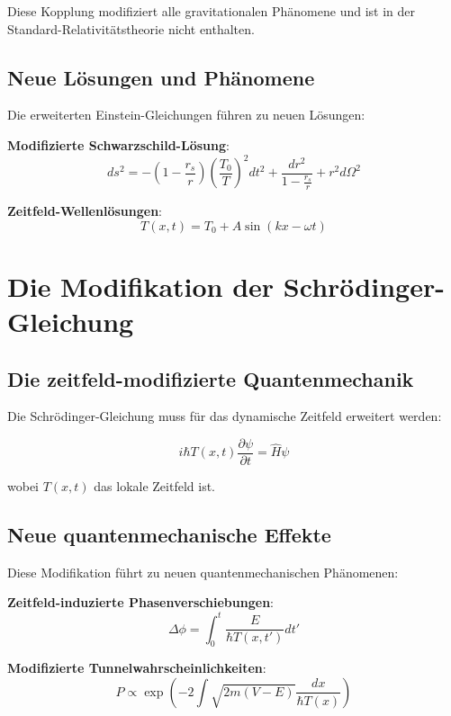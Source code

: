 \documentclass[12pt,a4paper]{report}
\begin{document}
Diese Kopplung modifiziert alle gravitationalen Phänomene und ist in der Standard-Relativitätstheorie nicht enthalten.

\subsection{Neue Lösungen und Phänomene}

Die erweiterten Einstein-Gleichungen führen zu neuen Lösungen:

\textbf{Modifizierte Schwarzschild-Lösung}:
\begin{equation}
	ds^2 = -\left(1-\frac{r_s}{r}\right)\left(\frac{T_0}{T}\right)^2 dt^2 + \frac{dr^2}{1-\frac{r_s}{r}} + r^2d\Omega^2
\end{equation}

\textbf{Zeitfeld-Wellenlösungen}:
\begin{equation}
	T(x,t) = T_0 + A \sin(kx - \omega t)
\end{equation}

\section{Die Modifikation der Schrödinger-Gleichung}

\subsection{Die zeitfeld-modifizierte Quantenmechanik}

Die Schrödinger-Gleichung muss für das dynamische Zeitfeld erweitert werden:

\begin{equation}
	i\hbar T(x,t) \frac{\partial\psi}{\partial t} = \hat{H}\psi
\end{equation}

wobei $T(x,t)$ das lokale Zeitfeld ist.

\subsection{Neue quantenmechanische Effekte}

Diese Modifikation führt zu neuen quantenmechanischen Phänomenen:

\textbf{Zeitfeld-induzierte Phasenverschiebungen}:
\begin{equation}
	\Delta\phi = \int_0^t \frac{E}{\hbar T(x,t')} dt'
\end{equation}

\textbf{Modifizierte Tunnelwahrscheinlichkeiten}:
\begin{equation}
	P \propto \exp\left(-2\int \sqrt{2m(V-E)} \frac{dx}{\hbar T(x)}\right)
\end{equation}
\end{document}
